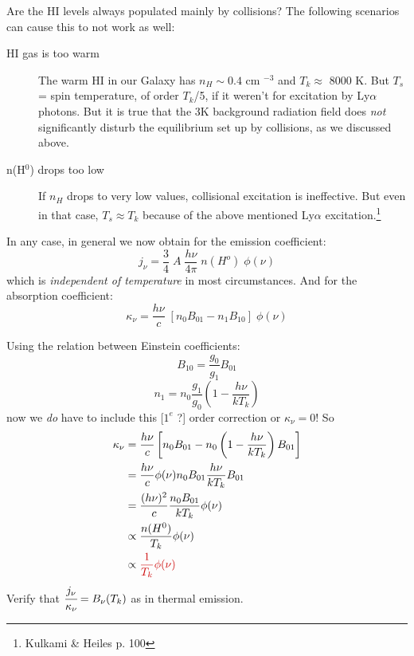 \documentclass[11pt]{article}
\newcommand{\mar}[1]{\hspace{0pt}\marginpar{-\textcolor{black}{#1}-}}
\begin{document}
Are the HI levels always populated mainly by collisions?
The following scenarios can cause this to not work as well:
\begin{description}
    \item [HI gas is too warm] The warm HI in our Galaxy has $n_{H}\sim0.4$ cm
        $^{-3}$ and $T_{k} \approx$ 8000 K. But $T_{s}$ = spin temperature, of
        order $T_{k}$/5, if it weren't for excitation by Ly$\alpha$ photons.
        But it is true that the 3K background radiation field does \emph{not}
        significantly disturb the equilibrium set up by collisions, as we
        discussed above.
    \item [n(H$^{0}$) drops too low]
        If $n_{H}$ drops to very low values, collisional excitation is
        ineffective. But even in that case, $T_{s} \approx T_{k}$ because of
        the above mentioned Ly$\alpha$ excitation.\footnote{Kulkami \& Heiles p. 100}
\end{description}

In any case, in general we now obtain for the emission coefficient:
\[
    j_{\nu} = \frac{3}{4}\; A\; \frac{h\nu}{4\pi}\; n(H^{o})\; \phi(\nu)
    \]
which is \emph{independent of temperature} in most circumstances.
And for the absorption coefficient:
\[
    \kappa_{\nu} = \frac{h\nu}{c}\; \left[
        n_{0}B_{01} - n_{1}B_{10} \right]\;
        \phi(\nu)
    \]

\mar{38}
Using the relation between Einstein coefficients:
\[
    B_{10} = \frac{g_{0}}{g_{1}} B_{01}
    \]
\[
    n_{1} = n_{0} \frac{g_{1}}{g_{0}} \left( 1 - \frac{h\nu}{kT_{k}} \right)
    \]
now we \emph{do} have to include this [$1^{e}$ ?]
order correction or $\kappa_{\nu} = 0$! So
\begin{align*}
    \kappa_{\nu}
    &= \frac{h\nu}{c} \left[
        n_{0}B_{01} - n_{0} \left( 1 - \frac{h\nu}{kT_{k}} \right) B_{01} \right]
    \\ &= \frac{h\nu}{c} \phi(\nu) n_{0}B_{01} \frac{h\nu}{kT_{k}} B_{01}
    \\ &= \frac{(h\nu)^{2}}{c} \frac{n_{0}B_{01}}{kT_{k}} \phi(\nu)
    \\ &\propto \frac{n (H^{0})}{T_{k}} \phi(\nu)
    \\ &\propto \textcolor{bred}{ \frac{1}{T_{k}} \phi(\nu)}
\end{align*}
Verify that $\cfrac{j_{\nu}}{\kappa_{\nu}} = B_{\nu}(T_{k})$ as in
thermal emission.
\end{document}
